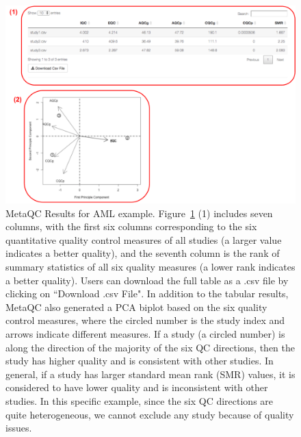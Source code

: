 \begin{figure}[H]
\begin{center}
\includegraphics[scale=0.65]{./figure/metaQC/metaQCresult_AML.pdf}
\caption{MetaQC Results for AML example.
Figure~\ref{fig:MetaQCresult_AML} {\color{red} (1)} includes seven columns, 
with the first six columns corresponding to the six quantitative quality control measures of all studies (a larger value indicates a better quality), 
and the seventh column is the rank of summary statistics of all six quality measures (a lower rank indicates a better quality). 
Users can download the full table as a .csv file by clicking on ``Download .csv File". 
In addition to the tabular results, MetaQC also generated a PCA biplot based on the six quality control measures, 
where the circled number is the study index and arrows indicate different measures. 
If a study (a circled number) is along the direction of the majority of the six QC directions, 
then the study has higher quality and is consistent with other studies.
In general, if a study has larger standard mean rank (SMR) values, 
it is considered to have lower quality and is inconsistent with other studies.
In this specific example, since the six QC directions are quite heterogeneous, 
we cannot exclude any study because of quality issues.
}
\label{fig:MetaQCresult_AML}
\end{center}
\end{figure}


